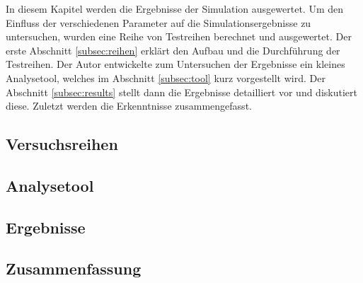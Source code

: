 
\label{sec:experimente}In diesem Kapitel werden die Ergebnisse der Simulation ausgewertet. Um den Einfluss der verschiedenen Parameter auf die Simulationsergebnisse zu untersuchen, wurden eine Reihe von Testreihen berechnet und ausgewertet. Der erste Abschnitt \ref{subsec:reihen} erklärt den Aufbau und die Durchführung der Testreihen. Der Autor entwickelte zum Untersuchen der Ergebnisse ein kleines Analysetool, welches im Abschnitt \ref{subsec:tool} kurz vorgestellt wird. Der Abschnitt \ref{subsec:results} stellt dann die Ergebnisse detailliert vor und diskutiert diese. Zuletzt werden die Erkenntnisse zusammengefasst.

\subsection{Versuchsreihen}


\subsection{Analysetool}


\subsection{Ergebnisse}


\subsection{Zusammenfassung}
